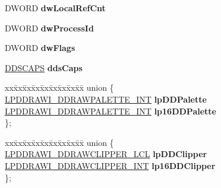 \begin{DoxyCompactItemize}
\item 
\mbox{\label{struct___d_d_r_a_w_i___d_d_r_a_w_s_u_r_f_a_c_e___l_c_l_a282a9069b18c4179122074d022f33bce}} 
D\+W\+O\+RD {\bfseries dw\+Local\+Ref\+Cnt}
\item 
\mbox{\label{struct___d_d_r_a_w_i___d_d_r_a_w_s_u_r_f_a_c_e___l_c_l_a3fc5d067ae3df4cc017de0ec59008090}} 
D\+W\+O\+RD {\bfseries dw\+Process\+Id}
\item 
\mbox{\label{struct___d_d_r_a_w_i___d_d_r_a_w_s_u_r_f_a_c_e___l_c_l_a7b72724b4af946ee35b1f2cf29550add}} 
D\+W\+O\+RD {\bfseries dw\+Flags}
\item 
\mbox{\label{struct___d_d_r_a_w_i___d_d_r_a_w_s_u_r_f_a_c_e___l_c_l_ac1c6b9d419b72f695a05b0dc0405d4f2}} 
\hyperlink{struct___d_d_s_c_a_p_s}{D\+D\+S\+C\+A\+PS} {\bfseries dds\+Caps}
\item 
\mbox{\label{struct___d_d_r_a_w_i___d_d_r_a_w_s_u_r_f_a_c_e___l_c_l_a39464d1e77e7bae510e1c6ecd1ec6de4}} 
\begin{tabbing}
xx\=xx\=xx\=xx\=xx\=xx\=xx\=xx\=xx\=\kill
union \{\\
\>\hyperlink{struct___d_d_r_a_w_i___d_d_r_a_w_p_a_l_e_t_t_e___i_n_t}{LPDDRAWI\_DDRAWPALETTE\_INT} {\bfseries lpDDPalette}\\
\>\hyperlink{struct___d_d_r_a_w_i___d_d_r_a_w_p_a_l_e_t_t_e___i_n_t}{LPDDRAWI\_DDRAWPALETTE\_INT} {\bfseries lp16DDPalette}\\
\}; \\

\end{tabbing}\item 
\mbox{\label{struct___d_d_r_a_w_i___d_d_r_a_w_s_u_r_f_a_c_e___l_c_l_ae1b695cae179d926febae862b20b0712}} 
\begin{tabbing}
xx\=xx\=xx\=xx\=xx\=xx\=xx\=xx\=xx\=\kill
union \{\\
\>\hyperlink{struct___d_d_r_a_w_i___d_d_r_a_w_c_l_i_p_p_e_r___l_c_l}{LPDDRAWI\_DDRAWCLIPPER\_LCL} {\bfseries lpDDClipper}\\
\>\hyperlink{struct___d_d_r_a_w_i___d_d_r_a_w_c_l_i_p_p_e_r___i_n_t}{LPDDRAWI\_DDRAWCLIPPER\_INT} {\bfseries lp16DDClipper}\\
\}; \\


\end{tabbing}
\end{DoxyCompactItemize}
